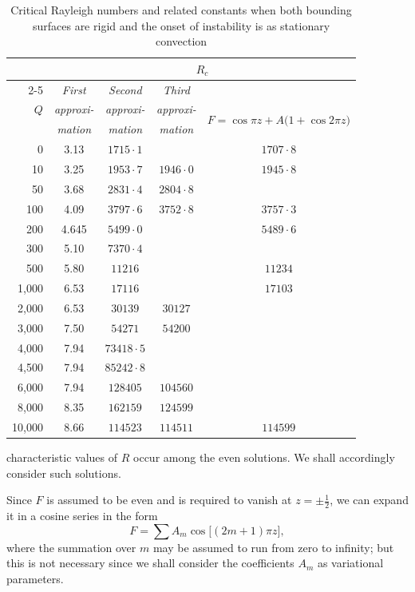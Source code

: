 \begin{table}[t]
\centering
\caption{Critical Rayleigh numbers and related constants when both bounding surfaces are rigid and the onset of instability is as stationary convection}
\label{tab:XV}
\smallskip
\begin{tabular}{r@{\qquad}c@{\qquad}c@{\qquad}c@{\qquad}c}
\hline
& \multicolumn{4}{c}{$R_c$} \\
\cline{2-5}
& \emph{First} & \emph{Second} & \emph{Third} & \\
$Q$ & \emph{approxi-} & \emph{approxi-} & \emph{approxi-} & \multirow{2}{*}{$F=\cos\pi z+A\bigl(1+\cos 2\pi z\bigr)$} \\
& \emph{mation} & \emph{mation} & \emph{mation} & \\
\hline
0 & 3.13 & $1715{\cdot}1$ & & $1707{\cdot}8$ \\
10 & 3.25 & $1953{\cdot}7$ & $1946{\cdot}0$ & $1945{\cdot}8$ \\
50 & 3.68 & $2831{\cdot}4$ & $2804{\cdot}8$ & \\
100 & 4.09 & $3797{\cdot}6$ & $3752{\cdot}8$ & $3757{\cdot}3$ \\
200 & 4.645 & $5499{\cdot}0$ & & $5489{\cdot}6$ \\
300 & 5.10 & $7370{\cdot}4$ & & \\
500 & 5.80 & $11216$ & & $11234$ \\
1{,}000 & 6.53 & $17116$ & & $17103$ \\
2{,}000 & 6.53 & $30139$ & $30127$ & \\
3{,}000 & 7.50 & $54271$ & $54200$ & \\
4{,}000 & 7.94 & $73418{\cdot}5$ & & \\
4{,}500 & 7.94 & $85242{\cdot}8$ & & \\
6{,}000 & 7.94 & $128405$ & $104560$ & \\
8{,}000 & 8.35 & $162159$ & $124599$ & \\
10{,}000 & 8.66 & $114523$ & $114511$ & $114599$ \\
\hline
\end{tabular}
\end{table}
%
characteristic values of $R$ occur among the even solutions. We shall accordingly consider such solutions.

Since $F$ is assumed to be even and is required to vanish at $z=\pm\tfrac{1}{2}$, we can expand it in a cosine series in the form
\begin{equation}
\label{eq:4-171}
F = \sum A_m\cos\bigl[(2m+1)\pi z\bigr],
\end{equation}
where the summation over $m$ may be assumed to run from zero to infinity; but this is not necessary since we shall consider the coefficients $A_m$ as variational parameters.

